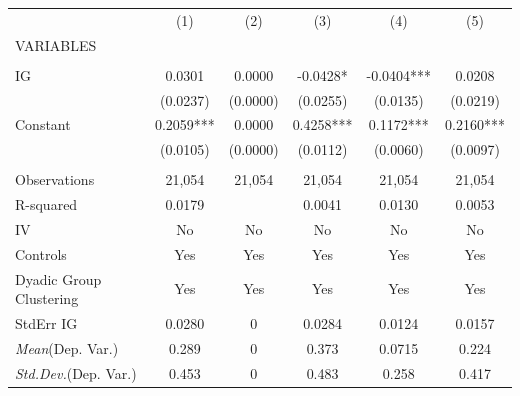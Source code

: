 \documentclass[]{article}
\begin{document}
\begin{tabular}{lccccc} \hline
 & (1) & (2) & (3) & (4) & (5) \\
VARIABLES &  &  &  &  &  \\ \hline
 &  &  &  &  &  \\
IG & 0.0301 & 0.0000 & -0.0428* & -0.0404*** & 0.0208 \\
 & (0.0237) & (0.0000) & (0.0255) & (0.0135) & (0.0219) \\
Constant & 0.2059*** & 0.0000 & 0.4258*** & 0.1172*** & 0.2160*** \\
 & (0.0105) & (0.0000) & (0.0112) & (0.0060) & (0.0097) \\
 &  &  &  &  &  \\
Observations & 21,054 & 21,054 & 21,054 & 21,054 & 21,054 \\
R-squared & 0.0179 &  & 0.0041 & 0.0130 & 0.0053 \\
IV & No & No & No & No & No \\
Controls & Yes & Yes & Yes & Yes & Yes \\
Dyadic Group Clustering & Yes & Yes & Yes & Yes & Yes \\
StdErr IG & 0.0280 & 0 & 0.0284 & 0.0124 & 0.0157 \\
\textit{Mean}(Dep. Var.) & 0.289 & 0 & 0.373 & 0.0715 & 0.224 \\
 \textit{Std.Dev.}(Dep. Var.) & 0.453 & 0 & 0.483 & 0.258 & 0.417 \\ \hline
\end{tabular}
\end{document}
